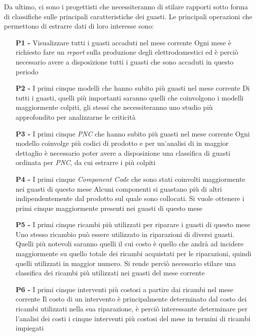\documentclass[a4paper, 12pt]{report}
\begin{document}
Da ultimo, ci sono i progettisti che necessiteranno di stilare rapporti sotto forma di classifiche sulle principali caratteristiche dei guasti. Le principali operazioni che
permettono di estrarre dati di loro interesse sono:

\begin{itemize}
	\item[\textbf{P1 -}] Visualizzare tutti i guasti accaduti nel mese corrente
		\subitem Ogni mese è richiesto fare un \textit{report} sulla produzione degli elettrodomestici ed è perciò necessario avere a disposizione tutti i guasti che sono accaduti in questo periodo
	\item[\textbf{P2 -}] I primi cinque modelli che hanno subito più guasti nel mese corrente
		\subitem Di tutti i guasti, quelli più importanti saranno quelli che coinvolgono i modelli maggiormente colpiti, gli stessi che necessiteranno uno studio più approfondito per analizzarne 
		le criticità
	\item[\textbf{P3 -}] I primi cinque \textit{PNC} che hanno subito più guasti nel mese corrente
		\subitem Ogni modello coinvolge più codici di prodotto e per un'analisi di in maggior dettaglio è necessario poter avere a disposizione una classifica
		di guasti ordinata per \textit{PNC}, da cui estrarre i più colpiti
	\item[\textbf{P4 -}] I primi cinque \textit{Component Code} che sono stati coinvolti maggiormente nei guasti di questo mese
		\subitem Alcuni componenti si guastano più di altri indipendentemente dal prodotto sul quale sono collocati. Si vuole ottenere i primi cinque maggiormente presenti nei guasti di questo 
		mese
	\item[\textbf{P5 -}] I primi cinque ricambi più utilizzati per riparare i guasti di questo mese
		\subitem Uno stesso ricambio può essere utilizzato in riparazioni di diversi guasti. Quelli più notevoli saranno quelli il cui costo è quello che andrà ad incidere maggiormente su quello 
		totale dei ricambi acquistati per le riparazioni, quindi quelli utilizzati in maggior numero. Si rende perciò necessario stilare una classifica dei ricambi più utilizzati nei guasti del 
		mese corrente
	\item[\textbf{P6 -}] I primi cinque interventi più costosi a partire dai ricambi nel mese corrente
		\subitem Il costo di un intervento è principalmente determinato dal costo dei ricambi utilizzati nella sua riparazione, è perciò interessante
		determinare per l'analisi dei costi i cinque interventi più costosi del mese in termini di ricambi impiegati

\end{itemize}
\end{document}
